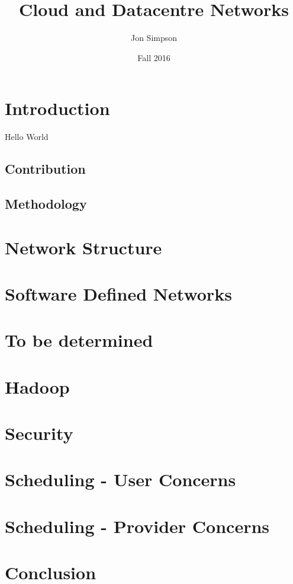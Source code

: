 \documentclass[fullapage,12pt]{article}
\title{Cloud and Datacentre Networks}
\author{Jon Simpson}
\date{Fall 2016}
\begin{document}
\begin{titlepage}
\maketitle
\end{titlepage}

\section{Introduction}
Hello World

\subsection{Contribution}

\subsection{Methodology}

\section{Network Structure}

\section{Software Defined Networks}

\section{To be determined}

\section{Hadoop}

\section{Security}

\section{Scheduling - User Concerns}

\section{Scheduling - Provider Concerns}

\section{Conclusion}
\end{document}
